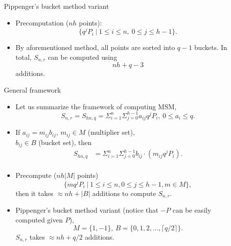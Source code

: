\documentclass[final]{beamer}
\newlength{\sepwid}
\newlength{\onecolwid}
\begin{document}
\begin{frame}[t]
\begin{columns}[t]
\begin{column}{\onecolwid}
\begin{block}{Pippenger's bucket method variant}
\begin{itemize}
			\item Precomputation ($nh$ points):
			\begin{equation*}
			\{q^{j}P_i\ |\ 1\le i \le n,\ 0\le j \le h-1\}. 
			\end{equation*}
			
			\item By aforementioned method, all points are sorted into $q-1$ buckets.
			In total, $S_{n,r}$ can be computed using 
			\begin{equation*}
			nh+ q -3
			\end{equation*} 
			additions.
	\end{itemize}
\end{block}

\begin{block}{General framework}
\small
	\begin{itemize}	
		\item Let us summarize the framework of computing MSM,
		$$ S_{n,r} = S_{hn,q}=\Sigma_{i=1}^{n}\Sigma_{j=0}^{h-1} a_{ij}q^j P_i,\ 0\le a_i\le q.$$
		
		\item If $a_{ij} = m_{ij}b_{ij}$, $m_{ij}\in M$ (multiplier set),\\ $b_{ij}\in B$ (bucket set), then
			\begin{equation*}
			\begin{aligned}
			S_{hn,q}&= \Sigma_{i=1}^{n}\Sigma_{j=0}^{h-1}b_{ij}\cdot (m_{ij}q^jP_i).\\
			\end{aligned} 
			\end{equation*}
		\item Precompute ($nh|M|$ points)
		\[ \{mq^jP_i\ |\ 1\le i\le n,0\le j\le h-1,m\in M\},\]
		then it takes $\approx nh +|B|$ additions to compute $S_{n,r}$.
		
		\item Pippenger's bucket method variant (notice that $-P$ can be easily computed given $P$),
		\[M =\{1,-1\},\ B =\{0,1,2,...,\lceil q/2\rceil\}.\] 
		$S_{n,r}$ takes $\approx nh + q/2$ additions.
	\end{itemize}

\end{block}
\end{column} 


\begin{column}{\sepwid}\end{column} %


\end{columns}
\end{frame}
\end{document}
